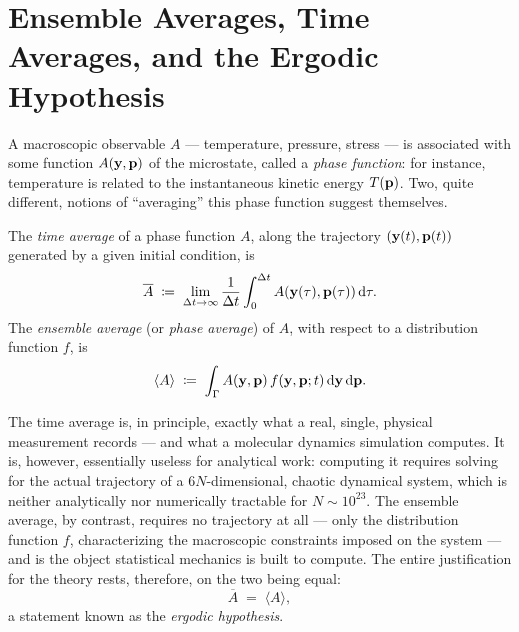 \section{Ensemble Averages, Time Averages, and the Ergodic Hypothesis}

A macroscopic observable $A$ --- temperature, pressure, stress --- is associated with some function $A(\mathbf{y},\mathbf{p})$ of the microstate, called a \textit{phase function}: for instance, temperature is related to the instantaneous kinetic energy $T(\mathbf{p})$. Two, quite different, notions of ``averaging'' this phase function suggest themselves.

\begin{definition}
	The \textit{time average} of a phase function $A$, along the trajectory $(\mathbf{y}(t),\mathbf{p}(t))$ generated by a given initial condition, is
	\begin{equation}
		\overline{A} \;\coloneqq\; \lim_{\Delta t\to\infty}\frac1{\Delta t}\int_0^{\Delta t} A(\mathbf{y}(\tau),\mathbf{p}(\tau))\,\mathrm{d}\tau.
	\end{equation}
	The \textit{ensemble average} (or \textit{phase average}) of $A$, with respect to a distribution function $f$, is
	\begin{equation}\label{ensembleavg}
		\langle A\rangle \;\coloneqq\; \int_\Gamma A(\mathbf{y},\mathbf{p})\,f(\mathbf{y},\mathbf{p};t)\,\mathrm{d}\mathbf{y}\,\mathrm{d}\mathbf{p}.
	\end{equation}
\end{definition}

The time average is, in principle, exactly what a real, single, physical measurement records --- and what a molecular dynamics simulation computes. It is, however, essentially useless for analytical work: computing it requires solving for the actual trajectory of a $6N$-dimensional, chaotic dynamical system, which is neither analytically nor numerically tractable for $N\sim10^{23}$. The ensemble average, by contrast, requires no trajectory at all --- only the distribution function $f$, characterizing the macroscopic constraints imposed on the system --- and is the object statistical mechanics is built to compute. The entire justification for the theory rests, therefore, on the two being equal:
\begin{equation}\label{ergodic}
	\overline{A} \;=\; \langle A\rangle,
\end{equation}
a statement known as the \textit{ergodic hypothesis}.

